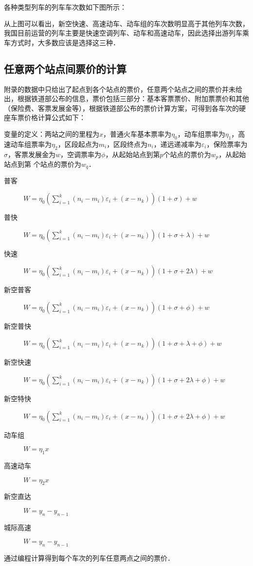 \documentclass[UTF8]{ctexart}
\begin{document}
各种类型列车的列车车次数如下图所示：

从上图可以看出，新空快速、高速动车、动车组的车次数明显高于其他列车次数，我国目前运营的列车主要是快速空调列车、动车和高速动车，因此选择出游列车乘车方式时，大多数应该是选择这三种．

\subsection{任意两个站点间票价的计算}
附录的数据中只给出了起点到各个站点的票价，任意两个站点之间的票价并未给出，根据铁道部公布的信息，票价包括三部分：基本客票票价、附加票票价和其他（保险费、客票发展金等），根据铁道部公布的票价计算方案，可得到各车次的硬座车票价格计算公式如下：

变量的定义：两站之间的里程为$x$，普通火车基本票率为$\eta_0$，动车组票率为$\eta_1$，高速动车组票率为$\eta_2$，区段起点为$m_i$，区段终点为$n_i$，递远递减率为$\varepsilon_i$，保险票率为$\sigma$，客票发展金为$w$，空调票率为$\phi$，从起始站点到第$p$个站点的票价为$w_p$，从起始站点到第 个站点的票价为$w_q$．

\begin{description}
  \item[普客] $W = \eta_0 (\sum_{i=1}^k (n_i - m_i)\varepsilon_i + (x - n_k))(1+\sigma)+w$
  \item[普快] $W = \eta_0 (\sum_{i=1}^k (n_i - m_i)\varepsilon_i + (x - n_k))(1+\sigma+\lambda)+w$
  \item[快速] $W = \eta_0 (\sum_{i=1}^k (n_i - m_i)\varepsilon_i + (x - n_k))(1+\sigma+2\lambda)+w$
  \item[新空普客] $W = \eta_0 (\sum_{i=1}^k (n_i - m_i)\varepsilon_i + (x - n_k))(1+\sigma+\phi)+w$
  \item[新空普快] $W = \eta_0 (\sum_{i=1}^k (n_i - m_i)\varepsilon_i + (x - n_k))(1+\sigma+\lambda+\phi)+w$
  \item[新空快速] $W = \eta_0 (\sum_{i=1}^k (n_i - m_i)\varepsilon_i + (x - n_k))(1+\sigma+2\lambda+\phi)+w$
  \item[新空特快] $W = \eta_0 (\sum_{i=1}^k (n_i - m_i)\varepsilon_i + (x - n_k))(1+\sigma+2\lambda+\phi)+w$
  \item[动车组] $W = \eta_1 x$
  \item[高速动车] $W = \eta_2 x$
  \item[新空直达] $W = y_n - y_{n-1}$
  \item[城际高速] $W = y_n - y_{n-1}$
\end{description}
通过编程计算得到每个车次的列车任意两点之间的票价．
\end{document}
